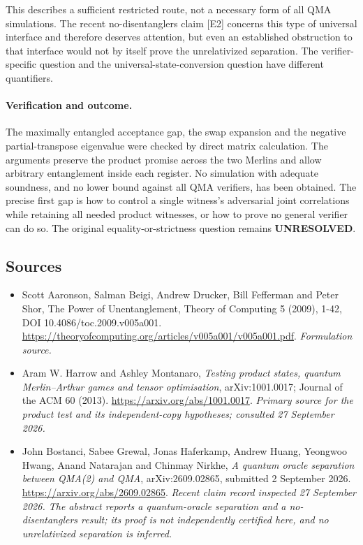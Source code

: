 \documentclass[11pt]{article}
\begin{document}
This describes a sufficient restricted route, not a necessary form of
all QMA simulations. The recent no-disentanglers claim [E2] concerns
this type of universal interface and therefore deserves attention,
but even an established obstruction to that interface would not by
itself prove the unrelativized separation. The verifier-specific
question and the universal-state-conversion question have different
quantifiers.

\paragraph{Verification and outcome.}
The maximally entangled acceptance gap, the swap expansion and the
negative partial-transpose eigenvalue were checked by direct matrix
calculation. The arguments preserve the product promise across the
two Merlins and allow arbitrary entanglement inside each register.
No simulation with adequate soundness, and no lower bound against all
QMA verifiers, has been obtained. The precise first gap is how to
control a single witness's adversarial joint correlations while
retaining all needed product witnesses, or how to prove no general
verifier can do so. The original equality-or-strictness question remains
\textbf{UNRESOLVED}.

\subsection{Sources}
\begin{itemize}
\item[S1]Scott Aaronson, Salman Beigi, Andrew Drucker, Bill Fefferman and Peter Shor, The Power of Unentanglement, Theory of Computing 5 (2009), 1-42, DOI 10.4086/toc.2009.v005a001.
\url{https://theoryofcomputing.org/articles/v005a001/v005a001.pdf}.
\textit{Formulation source.}
\item[E1]Aram W. Harrow and Ashley Montanaro, \emph{Testing product states, quantum Merlin--Arthur games and tensor optimisation}, arXiv:1001.0017; Journal of the ACM 60 (2013).
\url{https://arxiv.org/abs/1001.0017}.
\textit{Primary source for the product test and its independent-copy hypotheses; consulted 27 September 2026.}
\item[E2]John Bostanci, Sabee Grewal, Jonas Haferkamp, Andrew Huang, Yeongwoo Hwang, Anand Natarajan and Chinmay Nirkhe, \emph{A quantum oracle separation between QMA(2) and QMA}, arXiv:2609.02865, submitted 2 September 2026.
\url{https://arxiv.org/abs/2609.02865}.
\textit{Recent claim record inspected 27 September 2026. The abstract reports a quantum-oracle separation and a no-disentanglers result; its proof is not independently certified here, and no unrelativized separation is inferred.}
\end{itemize}
\end{document}
